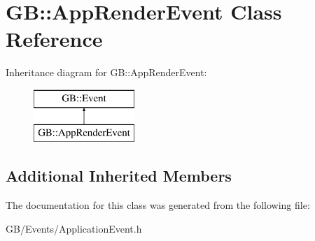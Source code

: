 \hypertarget{class_g_b_1_1_app_render_event}{}\section{GB\+::App\+Render\+Event Class Reference}
\label{class_g_b_1_1_app_render_event}
Inheritance diagram for GB\+::App\+Render\+Event\+:\begin{figure}[H]
\begin{center}
\leavevmode
\includegraphics[height=2.000000cm]{class_g_b_1_1_app_render_event}
\end{center}
\end{figure}
\subsection*{Additional Inherited Members}


The documentation for this class was generated from the following file\+:\begin{DoxyCompactItemize}
\item 
G\+B/\+Events/Application\+Event.\+h\end{DoxyCompactItemize}
